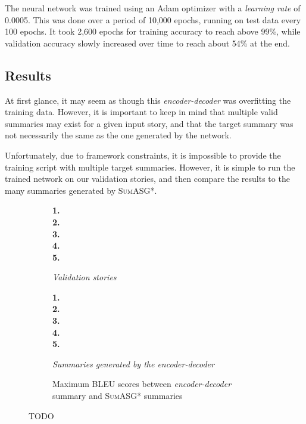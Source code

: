 The neural network was trained using an Adam optimizer with a \textit{learning rate} of 0.0005. This was done over a period of 10,000 epochs, running on test data every 100 epochs. It took 2,600 epochs for training accuracy to reach above 99\%, while validation accuracy slowly increased over time to reach about 54\% at the end.

\subsection{Results}

At first glance, it may seem as though this \textit{encoder-decoder} was overfitting the training data. However, it is important to keep in mind that multiple valid summaries may exist for a given input story, and that the target summary was not necessarily the same as the one generated by the network.

Unfortunately, due to framework constraints, it is impossible to provide the training script with multiple target summaries. However, it is simple to run the trained network on our validation stories, and then compare the results to the many summaries generated by \textsc{SumASG*}.

\begin{figure}[H]
\begin{subfigure}{\textwidth}
\begin{displayquote}
\textbf{1.}\\
\textbf{2.}\\
\textbf{3.}\\
\textbf{4.}\\
\textbf{5.}\\
\end{displayquote}
\caption{\textit{Validation stories}}
\end{subfigure}
\begin{subfigure}{\textwidth}
\vspace{\baselineskip}
\begin{displayquote}
\textbf{1.}\\
\textbf{2.}\\
\textbf{3.}\\
\textbf{4.}\\
\textbf{5.}\\
\end{displayquote}
\caption{\textit{Summaries generated by the \textit{encoder-decoder}}}
\end{subfigure}
\begin{subfigure}{\textwidth}
\vspace{\baselineskip}

\caption{Maximum BLEU scores between \textit{encoder-decoder} summary and \textsc{SumASG*} summaries}
\end{subfigure}
\caption{TODO}
\label{fig:neural_network_validation}
\end{figure}

